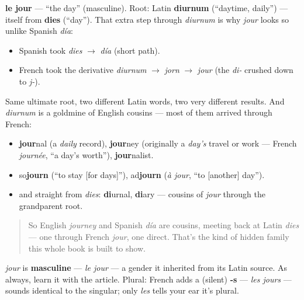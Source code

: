 \begin{cousinweb}
\textbf{le jour} — \textquotedblleft{}the day\textquotedblright{} (masculine). Root: Latin \textbf{diurnum} (\textquotedblleft{}daytime, daily\textquotedblright{}) — itself from \textbf{dies} (\textquotedblleft{}day\textquotedblright{}). That extra step through \emph{diurnum} is why \emph{jour} looks so unlike Spanish \emph{día}:

\begin{itemize}
\raggedright
  \item Spanish took \emph{dies} $\to$ \emph{día} (short path).
  \item French took the derivative \emph{diurnum} $\to$ \emph{jorn} $\to$ \emph{jour} (the \emph{di-} crushed down to \emph{j-}).
\end{itemize}

Same ultimate root, two different Latin words, two very different results. And \emph{diurnum} is a goldmine of English cousins — most of them arrived through French:

\begin{itemize}
\raggedright
  \item \textbf{jour}nal (a \emph{daily} record), \textbf{jour}ney (originally a \emph{day's} travel or work — French \emph{journée}, \textquotedblleft{}a day's worth\textquotedblright{}), \textbf{jour}nalist.
  \item so\textbf{journ} (\textquotedblleft{}to stay {[}for days{]}\textquotedblright{}), ad\textbf{journ} (\emph{à jour}, \textquotedblleft{}to {[}another{]} day\textquotedblright{}).
  \item and straight from \emph{dies}: \textbf{di}urnal, \textbf{di}ary — cousins of \emph{jour} through the grandparent root.
\end{itemize}

\begin{quote}
So English \emph{journey} and Spanish \emph{día} are cousins, meeting back at Latin \emph{dies} — one through French \emph{jour}, one direct. That's the kind of hidden family this whole book is built to show.
\end{quote}
\end{cousinweb}

\begin{grammarlens}[title={Grammar Lens}]
\emph{jour} is \textbf{masculine} — \emph{le jour} — a gender it inherited from its Latin source. As always, learn it with the article. Plural: French adds a (silent) \textbf{-s} — \emph{les jours} — sounds identical to the singular; only \emph{les} tells your ear it's plural.
\end{grammarlens}

